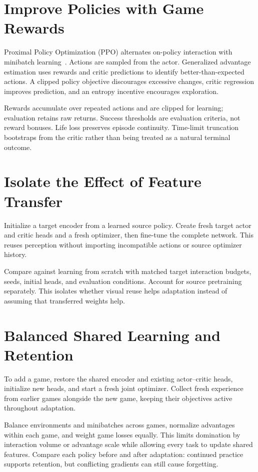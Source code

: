 \section{Improve Policies with Game Rewards}
Proximal Policy Optimization (PPO) alternates on-policy interaction
with minibatch learning~\cite{schulman2017}. Actions are sampled from
the actor. Generalized advantage estimation uses rewards and critic
predictions to identify better-than-expected actions. A clipped policy
objective discourages excessive changes, critic regression improves
prediction, and an entropy incentive encourages exploration.

Rewards accumulate over repeated actions and are clipped for learning;
evaluation retains raw returns. Success thresholds are evaluation
criteria, not reward bonuses. Life loss preserves episode continuity.
Time-limit truncation bootstraps from the critic rather than being
treated as a natural terminal outcome.

\section{Isolate the Effect of Feature Transfer}
Initialize a target encoder from a learned source policy. Create fresh
target actor and critic heads and a fresh optimizer, then fine-tune
the complete network. This reuses perception without importing
incompatible actions or source optimizer history.

Compare against learning from scratch with matched target interaction
budgets, seeds, initial heads, and evaluation conditions. Account for
source pretraining separately. This isolates whether visual reuse
helps adaptation instead of assuming that transferred weights help.

\section{Balanced Shared Learning and Retention}
To add a game, restore the shared encoder and existing actor--critic
heads, initialize new heads, and start a fresh joint optimizer.
Collect fresh experience from earlier games alongside the new game,
keeping their objectives active throughout adaptation.

Balance environments and minibatches across games, normalize
advantages within each game, and weight game losses equally. This
limits domination by interaction volume or advantage scale while
allowing every task to update shared features. Compare each policy
before and after adaptation: continued practice supports retention,
but conflicting gradients can still cause forgetting.

